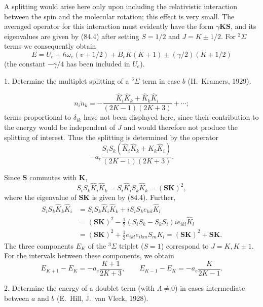 

A splitting would arise here only upon including the relativistic interaction between the spin and the molecular rotation; this effect is very small. The averaged operator for this interaction must evidently have the form $\gamma\mathbf K\mathbf S$, and its eigenvalues are given by (84.4) after setting $S=1/2$ and $J=K\pm1/2$. For ${}^2\Sigma$ terms we consequently obtain
\begin{equation}
 E=U_e+\hbar\omega_e(v+1/2)+B_eK(K+1)\pm(\gamma/2)(K+1/2)
 \tag{84.8}
\end{equation}
(the constant $-\gamma/4$ has been included in $U_e$).

\ProblemHeading

1. Determine the multiplet splitting of a ${}^3\Sigma$ term in case $b$ (H.~Kramers, 1929).


\[
 \overline{n_in_k}=-\frac{\widehat K_i\widehat K_k+\widehat K_k\widehat K_i}{(2K-1)(2K+3)}+\cdots;
\]
terms proportional to $\delta_{ik}$ have not been displayed here, since their contribution to the energy would be independent of $J$ and would therefore not produce the splitting of interest. Thus the splitting is determined by the operator
\[
 -a_e\frac{S_iS_k(\widehat K_i\widehat K_k+\widehat K_k\widehat K_i)}{(2K-1)(2K+3)}.
\]

Since $\mathbf S$ commutes with $\mathbf K$,
\[
 S_iS_k\widehat K_i\widehat K_k=S_i\widehat K_iS_k\widehat K_k=(\mathbf S\mathbf K)^2,
\]
where the eigenvalue of $\mathbf S\mathbf K$ is given by (84.4). Further,
\begin{align*}
 S_iS_k\widehat K_k\widehat K_i
 &=S_iS_k\widehat K_i\widehat K_k+iS_iS_k e_{kil}\widehat K_l\\
 &=(\mathbf S\mathbf K)^2-\frac12(S_iS_k-S_kS_i)i e_{ikl}\widehat K_l\\
 &=(\mathbf S\mathbf K)^2+\frac12e_{ikl}e_{ikm}S_mK_l
  =(\mathbf S\mathbf K)^2+\mathbf S\mathbf K.
\end{align*}
The three components $E_K$ of the ${}^3\Sigma$ triplet ($S=1$) correspond to $J=K,K\pm1$. For the intervals between these components, we obtain
\[
 E_{K+1}-E_K=-a_e\frac{K+1}{2K+3},\qquad
 E_{K-1}-E_K=-a_e\frac{K}{2K-1}.
\]

2. Determine the energy of a doublet term (with $\Lambda\ne0$) in cases intermediate between $a$ and $b$ (E.~Hill, J.~van Vleck, 1928).

